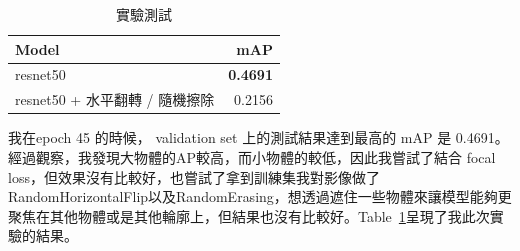 \documentclass[a4paper,12pt]{article}   %
\begin{document}
\begin{table}[htb]
	\centering	
	\normalsize
    \newcommand{\z}{\phantom{0}}
    \caption{實驗測試}
    \vspace{0.15\baselineskip}
	\begin{tabularx}{0.6\textwidth}{@{}lr@{}}\toprule
		\textbf{Model} & \textbf{mAP} \\
		\hline
		resnet50 & \textbf{0.4691}  \\ 
		resnet50 + 水平翻轉 / 隨機擦除  & 0.2156  \\
    		\hline

	\end{tabularx}
	\label{table:comparison1}
   \vspace{0.15\baselineskip}
\end{table}


	我在epoch 45 的時候， validation set 上的測試結果達到最高的 mAP 是 0.4691。經過觀察，我發現大物體的AP較高，而小物體的較低，因此我嘗試了結合 focal loss，但效果沒有比較好，也嘗試了拿到訓練集我對影像做了RandomHorizontalFlip以及RandomErasing，想透過遮住一些物體來讓模型能夠更聚焦在其他物體或是其他輪廓上，但結果也沒有比較好。Table\ \ref{table:comparison1}呈現了我此次實驗的結果。

\end{document}
